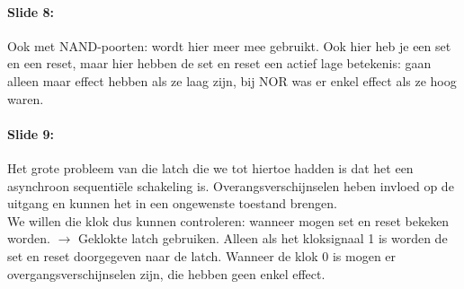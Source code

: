 \documentclass[10pt,a4paper]{book}
\begin{document}
\paragraph{Slide 8:} Ook met NAND-poorten: wordt hier meer mee gebruikt. Ook hier heb je een set en een reset, maar hier hebben de set en reset een actief lage betekenis: gaan alleen maar effect hebben als ze laag zijn, bij NOR was er enkel effect als ze hoog waren. 

\paragraph{Slide 9:} Het grote probleem van die latch die we tot hiertoe hadden is dat het een asynchroon sequenti\"ele schakeling is. Overangsverschijnselen heben invloed op de uitgang en kunnen het in een ongewenste toestand brengen.\\
We willen die klok dus kunnen controleren: wanneer mogen set en reset bekeken worden. $\rightarrow$ Geklokte latch gebruiken. Alleen als het kloksignaal 1 is worden de set en reset doorgegeven naar de latch. Wanneer de klok 0 is mogen er overgangsverschijnselen zijn, die hebben geen enkel effect.
\end{document}
